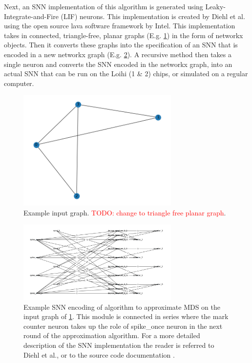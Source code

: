 Next, an SNN implementation of this algorithm is generated using Leaky-Integrate-and-Fire (LIF) neurons. This implementation is created by Diehl et al. \cite{diehl} using the open source lava software framework by Intel. This implementation takes in connected, triangle-free, planar graphs (E.g. \cref{fig:input_graph}) in the form of networkx objects. Then it converts these graphs into the specification of an SNN that is encoded in a new networkx graph (E.g. \cref{fig:encoded_snn}). A recursive method then takes a single neuron and converts the SNN encoded in the networkx graph, into an actual SNN that can be run on the Loihi (1 \& 2) chips, or simulated on a regular computer.
\begin{figure}[H]
    \centering
    \includegraphics[width=8cm]{latex/Images/input_graph.png}
    \caption{Example input graph. \textcolor{red}{TODO: change to triangle free planar graph}.%
    }
    \label{fig:input_graph}
\end{figure}

\begin{figure}[H]
    \centering
    \includegraphics[width=8cm]{latex/Images/structured_graph.png}
    \caption{Example SNN encoding of algorithm to approximate MDS on the input graph of \cref{fig:input_graph}. This module is connected in series where the mark counter neuron takes up the role of spike\_once neuron in the next round of the approximation algorithm. For a more detailed description of the SNN implementation the reader is referred to Diehl et al., or to the source code documentation \cite{}. %
    }
    \label{fig:encoded_snn}
\end{figure}

